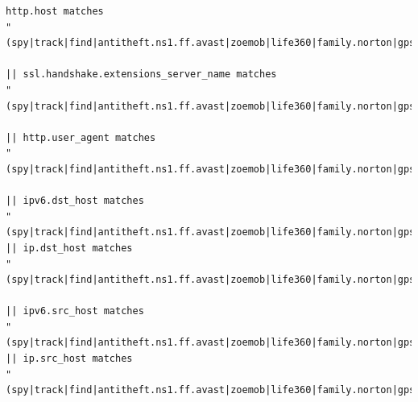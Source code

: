 \documentclass[acmtog]{acmart}
\begin{document}
\begin{lstlisting}
http.host matches 
"(spy|track|find|antitheft.ns1.ff.avast|zoemob|life360|family.norton|gpswox|geozilla)"

|| ssl.handshake.extensions_server_name matches 
"(spy|track|find|antitheft.ns1.ff.avast|zoemob|life360|family.norton|gpswox|geozilla)"

|| http.user_agent matches 
"(spy|track|find|antitheft.ns1.ff.avast|zoemob|life360|family.norton|gpswox|geozilla)"

|| ipv6.dst_host matches 
"(spy|track|find|antitheft.ns1.ff.avast|zoemob|life360|family.norton|gpswox|geozilla)"
|| ip.dst_host matches 
"(spy|track|find|antitheft.ns1.ff.avast|zoemob|life360|family.norton|gpswox|geozilla)"

|| ipv6.src_host matches 
"(spy|track|find|antitheft.ns1.ff.avast|zoemob|life360|family.norton|gpswox|geozilla)"
|| ip.src_host matches 
"(spy|track|find|antitheft.ns1.ff.avast|zoemob|life360|family.norton|gpswox|geozilla)"
\end{lstlisting}
\end{document}
